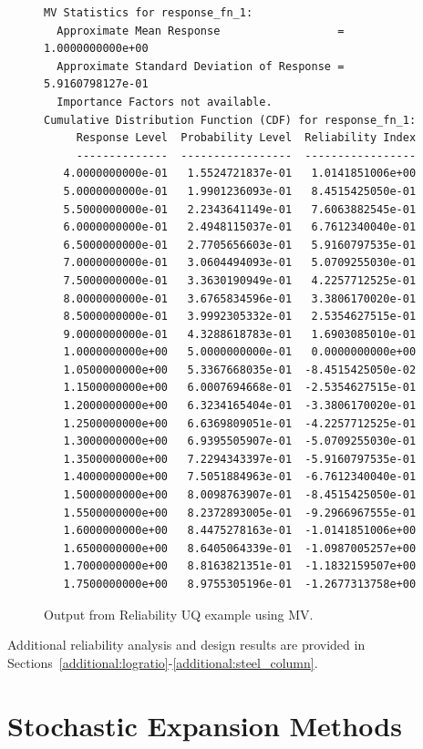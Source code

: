 \begin{figure}[htbp!] %
\begin{bigbox}
\begin{small}
\begin{verbatim}
MV Statistics for response_fn_1:
  Approximate Mean Response                  =  1.0000000000e+00
  Approximate Standard Deviation of Response =  5.9160798127e-01
  Importance Factors not available.
Cumulative Distribution Function (CDF) for response_fn_1:
     Response Level  Probability Level  Reliability Index
     --------------  -----------------  -----------------
   4.0000000000e-01   1.5524721837e-01   1.0141851006e+00
   5.0000000000e-01   1.9901236093e-01   8.4515425050e-01
   5.5000000000e-01   2.2343641149e-01   7.6063882545e-01
   6.0000000000e-01   2.4948115037e-01   6.7612340040e-01
   6.5000000000e-01   2.7705656603e-01   5.9160797535e-01
   7.0000000000e-01   3.0604494093e-01   5.0709255030e-01
   7.5000000000e-01   3.3630190949e-01   4.2257712525e-01
   8.0000000000e-01   3.6765834596e-01   3.3806170020e-01
   8.5000000000e-01   3.9992305332e-01   2.5354627515e-01
   9.0000000000e-01   4.3288618783e-01   1.6903085010e-01
   1.0000000000e+00   5.0000000000e-01   0.0000000000e+00
   1.0500000000e+00   5.3367668035e-01  -8.4515425050e-02
   1.1500000000e+00   6.0007694668e-01  -2.5354627515e-01
   1.2000000000e+00   6.3234165404e-01  -3.3806170020e-01
   1.2500000000e+00   6.6369809051e-01  -4.2257712525e-01
   1.3000000000e+00   6.9395505907e-01  -5.0709255030e-01
   1.3500000000e+00   7.2294343397e-01  -5.9160797535e-01
   1.4000000000e+00   7.5051884963e-01  -6.7612340040e-01
   1.5000000000e+00   8.0098763907e-01  -8.4515425050e-01
   1.5500000000e+00   8.2372893005e-01  -9.2966967555e-01
   1.6000000000e+00   8.4475278163e-01  -1.0141851006e+00
   1.6500000000e+00   8.6405064339e-01  -1.0987005257e+00
   1.7000000000e+00   8.8163821351e-01  -1.1832159507e+00
   1.7500000000e+00   8.9755305196e-01  -1.2677313758e+00
\end{verbatim}
\end{small}
\end{bigbox}
\caption{Output from Reliability UQ example using MV.}
\label{uq:rel_output_mv}
\end{figure}

Additional reliability analysis and design results are provided in 
Sections~\ref{additional:logratio}-\ref{additional:steel_column}.


\section{Stochastic Expansion Methods}\label{uq:expansion}


